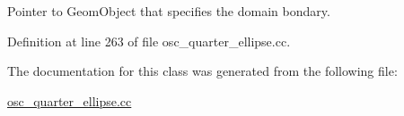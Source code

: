 Pointer to Geom\+Object that specifies the domain bondary. 



Definition at line 263 of file osc\+\_\+quarter\+\_\+ellipse.\+cc.



The documentation for this class was generated from the following file\+:\begin{DoxyCompactItemize}
\item 
\hyperlink{osc__quarter__ellipse_8cc}{osc\+\_\+quarter\+\_\+ellipse.\+cc}\end{DoxyCompactItemize}
